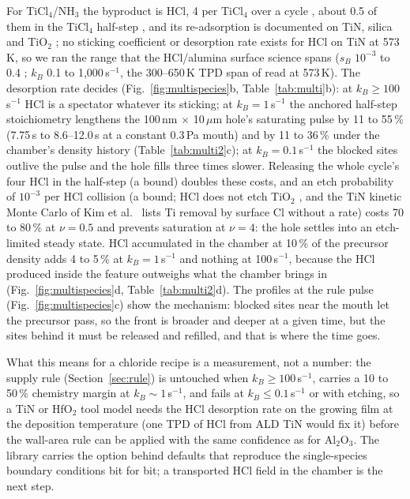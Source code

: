 \documentclass[11pt,letterpaper]{article}
\begin{document}
For TiCl$_4$/NH$_3$ the byproduct is HCl, 4 per TiCl$_4$ over a cycle \cite{ritala1995}, about 0.5 of them in the TiCl$_4$ half-step \cite{tiznado2006}, and its re-adsorption is documented on TiN, silica and TiO$_2$ \cite{tiznado2006,snyder2006,leem2014}; no sticking coefficient or desorption rate exists for HCl on TiN at 573\,K, so we ran the range that the HCl/alumina surface science spans ($s_B$ $10^{-3}$ to 0.4 \cite{elam2000,lostier2026}; $k_B$ 0.1 to 1,000\,s$^{-1}$, the 300--650\,K TPD span of \cite{elam2000} read at 573\,K). The desorption rate decides (Fig.~\ref{fig:multispecies}b, Table~\ref{tab:multi}b): at $k_B \geq 100$\,s$^{-1}$ HCl is a spectator whatever its sticking; at $k_B = 1$\,s$^{-1}$ the anchored half-step stoichiometry lengthens the 100\,nm $\times$ 10\,$\mu$m hole's saturating pulse by 11 to 55\,\% (7.75\,s to 8.6--12.0\,s at a constant 0.3\,Pa mouth) and by 11 to 36\,\% under the chamber's density history (Table~\ref{tab:multi2}c); at $k_B = 0.1$\,s$^{-1}$ the blocked sites outlive the pulse and the hole fills three times slower. Releasing the whole cycle's four HCl in the half-step (a bound) doubles these costs, and an etch probability of $10^{-3}$ per HCl collision (a bound; HCl does not etch TiO$_2$ \cite{leem2014}, and the TiN kinetic Monte Carlo of Kim et al.\ \cite{kim2022} lists Ti removal by surface Cl without a rate) costs 70 to 80\,\% at $\nu = 0.5$ and prevents saturation at $\nu = 4$: the hole settles into an etch-limited steady state. HCl accumulated in the chamber at 10\,\% of the precursor density adds 4 to 5\,\% at $k_B = 1$\,s$^{-1}$ and nothing at 100\,s$^{-1}$, because the HCl produced inside the feature outweighs what the chamber brings in (Fig.~\ref{fig:multispecies}d, Table~\ref{tab:multi2}d). The profiles at the rule pulse (Fig.~\ref{fig:multispecies}c) show the mechanism: blocked sites near the mouth let the precursor pass, so the front is broader and deeper at a given time, but the sites behind it must be released and refilled, and that is where the time goes.

What this means for a chloride recipe is a measurement, not a number: the supply rule (Section~\ref{sec:rule}) is untouched when $k_B \geq 100$\,s$^{-1}$, carries a 10 to 50\,\% chemistry margin at $k_B \sim 1$\,s$^{-1}$, and fails at $k_B \leq 0.1$\,s$^{-1}$ or with etching, so a TiN or HfO$_2$ tool model needs the HCl desorption rate on the growing film at the deposition temperature (one TPD of HCl from ALD TiN would fix it) before the wall-area rule can be applied with the same confidence as for Al$_2$O$_3$. The library carries the option behind defaults that reproduce the single-species boundary conditions bit for bit; a transported HCl field in the chamber is the next step.
\end{document}
